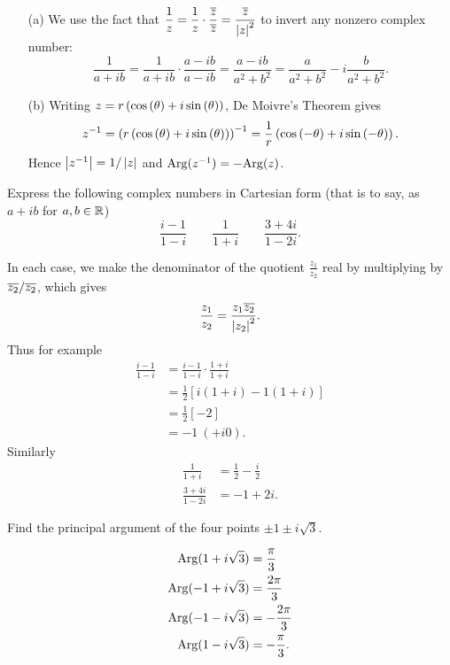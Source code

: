 \begin{questions}
\begin{answer}
\begin{enumerate}
\item[(a)] We use the fact that $\displaystyle \frac{1}{z} = \frac{1}{z} \cdot \frac{\overline{z}}{\overline{z}} = \frac{\overline{z}}{\left| z \right|^2}$ to invert any nonzero complex number:
\[
\frac{1}{a+ib} = \frac{1}{a+ib} \cdot \frac{a-ib}{a-ib} = \frac{a-ib}{a^2+b^2} = \frac{a}{a^2+b^2} - i\frac{b}{a^2+b^2}.
\]
\item[(b)] Writing $z=r \left( \cos \left( \theta \right) + i \sin \left( \theta \right) \right)$, De Moivre's Theorem gives
\[
z^{-1} = \left(r \left( \cos \left( \theta \right) + i \sin \left( \theta \right) \right)\right)^{-1} = \frac{1}{r} \left( \cos \left( -\theta \right) + i \sin \left( -\theta \right) \right).
\]
Hence $\left| z^{-1} \right| = 1/\left| z \right|$ and $\mathrm{Arg} (z^{-1})=-\mathrm{Arg} (z)$.
\end{enumerate}
\end{answer}

\question Express the following complex numbers in Cartesian form (that is to say, as $a+ib$ for $a,b \in \mathbb{R}$)
\[
\frac{i-1}{1-i}\qquad \frac{1}{1+i}\qquad \frac{3+4i}{1-2i}.
\]
\begin{answer}
In each case, we make the denominator of the quotient $\frac{z_1}{z_2}$ real by multiplying by $\overline{z_2}/ \overline{z_2}$, which gives
\[
\frac{z_1}{z_2} = \frac{z_1\overline{z_2}}{\left| z_2 \right|^2}.
\]
Thus for example
\begin{align*}
\frac{i-1}{1-i} & = \frac{i-1}{1-i} \cdot \frac{1+i}{1+i} \\
& = \frac{1}{2} \left[ i(1+i)-1(1+i) \right] \\
& = \frac{1}{2} \left[-2 \right] \\
& = -1\ (+i0).
\end{align*}
Similarly
\begin{align*}
\frac{1}{1+i} &=  \frac{1}{2} - \frac{i}{2} \\
\frac{3+4i}{1-2i} &= -1+2i.
\end{align*}
\end{answer}

\question Find the principal argument of the four points $\pm 1\pm i\sqrt{3}$.
\begin{answer}
\begin{align*}
\mathrm{Arg} (1+i\sqrt{3}) &= \frac{\pi}{3} \\
\mathrm{Arg} (-1+i \sqrt{3} ) &= \frac{2\pi}{3} \\
\mathrm{Arg} (-1-i\sqrt{3} ) &= - \frac{2\pi}{3} \\
\mathrm{Arg} (1-i\sqrt{3} ) &= - \frac{\pi}{3}. 
\end{align*}
\end{answer}





\end{questions}
